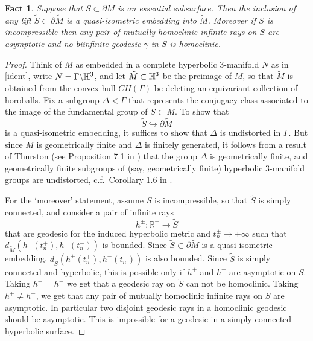 \documentclass[12pt]{amsart}
\newtheorem{fact}[theorem]{Fact}
\theoremstyle{definition}
\theoremstyle{remark}
\newcommand{\BR}{\mathbb R} \newcommand{\BD}{\mathbb D}
\begin{document}
\begin {fact}\label{incompressible-qg}
 Suppose that $S \subset \partial M$ is an essential subsurface. Then the inclusion of any lift $\tilde S \subset \partial \tilde M$ is a quasi-isometric embedding into $\tilde M$. Moreover if $S$ is incompressible then any pair of mutually homoclinic infinite rays on $S$ are asymptotic and no biinfinite geodesic $\gamma$ in $S$ is homoclinic.
\end {fact}
\begin {proof}
Think of $M$ as embedded in a complete hyperbolic $3$-manifold $N$ as in \eqref{ident}, write $N=\Gamma \backslash \mathbb H^3$, and let $\tilde M \subset \mathbb H^3$ be the preimage of $M$, so that $\tilde M$ is obtained from the convex hull $CH(\Gamma)$ be deleting an equivariant collection of horoballs. Fix a subgroup $\Delta < \Gamma$ that represents the conjugacy class associated to the image of the fundamental group of $S \subset M$. To show that $$\tilde S \hookrightarrow \partial \tilde M$$ is a quasi-isometric embedding, it suffices to show that $\Delta$ is undistorted in $\Gamma$. But since $M$ is geometrically finite and $\Delta$ is finitely generated, it follows from a result of Thurston (see Proposition 7.1 in \cite{morgan1984thurston}) that the group $\Delta$ is geometrically finite, and geometrically finite subgroups of (say, geometrically finite) hyperbolic $3$-manifold groups are undistorted, c.f.\ Corollary 1.6 in \cite{hruska2010relative}.

For the `moreover' statement, assume $S$ is incompressible, so that $\tilde S$ is simply connected, and consider a pair of infinite rays $$h^{\pm}:\BR^+\to \tilde S$$ that are geodesic for the induced hyperbolic metric and $t^{\pm}_n\to  +\infty$ such that $d_{\tilde M}(h^+(t_n^+),h^-(t_n^-))$ is bounded. Since $\tilde S \subset \partial \tilde M$ is a quasi-isometric embedding, $d_{\tilde S}(h^+(t_n^+),h^-(t_n^-))$ is also bounded. Since $\tilde S$ is simply connected and hyperbolic, this is possible only if $h^+$ and $h^-$ are asymptotic on $S$. Taking $h^+=h^-$ we get that a geodesic ray on $\tilde S$ can not be homoclinic. Taking $h^+\neq h^-$, we get that any pair of mutually homoclinic infinite rays on $S$ are asymptotic. In particular two disjoint geodesic rays in a homoclinic geodesic should be asymptotic. This is impossible for a geodesic in a simply connected hyperbolic surface.
\end {proof}
\end{document}
